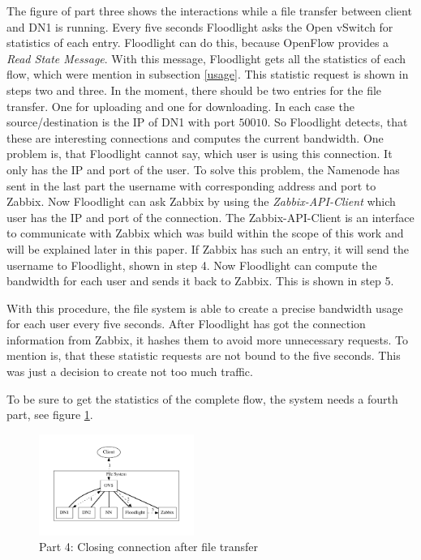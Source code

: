 The figure of part three shows the interactions while a file transfer between client and DN1 is running. Every five seconds Floodlight asks the Open vSwitch for statistics of each entry. Floodlight can do this, because OpenFlow provides a \textit{Read State Message}\cite[p. 30]{ofspec}. With this message, Floodlight gets all the statistics of each flow, which were mention in subsection \ref{usage}. This statistic request is shown in steps two and three. In the moment, there should be two entries for the file transfer. One for uploading and one for downloading. In each case the source/destination is the IP of DN1 with port $50010$. So Floodlight detects, that these are interesting connections and computes the current bandwidth. One problem is, that Floodlight cannot say, which user is using this connection. It only has the IP and port of the user. To solve this problem, the Namenode has sent in the last part the username with corresponding address and port to Zabbix. Now Floodlight can ask Zabbix by using the \textit{Zabbix-API-Client} which user has the IP and port of the connection. The Zabbix-API-Client is an interface to communicate with Zabbix which was build within the scope of this work and will be explained later in this paper. If Zabbix has such an entry, it will send the username to Floodlight, shown in step 4. Now Floodlight can compute the bandwidth for each user and sends it back to Zabbix. This is shown in step 5.

With this procedure, the file system is able to create a precise bandwidth usage for each user every five seconds. After Floodlight has got the connection information from Zabbix, it hashes them to avoid more unnecessary requests. To mention is, that these statistic requests are not bound to the five seconds. This was just a decision to create not too much traffic.

To be sure to get the statistics of the complete flow, the system needs a fourth part, see figure \ref{cc}.  

\begin{figure}[htp]
\centering
\includegraphics[width=0.45\textwidth]{img/closeConnection} 
\caption{Part 4: Closing connection after file transfer}
\label{cc}
\end{figure}

